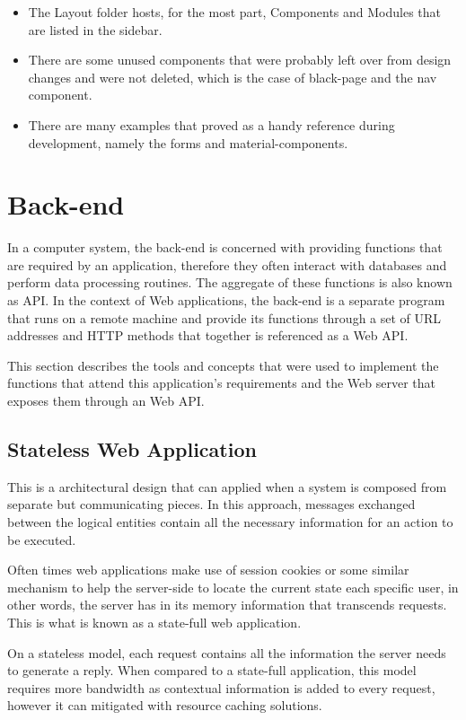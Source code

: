 \begin{itemize}
\item The Layout folder hosts, for the most part, Components and Modules that are listed in the sidebar.\item There are some unused components that were probably left over from design changes and were not deleted, which is the case of black-page and the nav component.
\item There are many examples that proved as a handy reference during development, namely the forms and material-components.
\end{itemize}

\section{Back-end}\label{cha:concepts:sec:backend}
In a computer system, the back-end is concerned with providing functions that are required by an application, therefore they often interact with databases and perform data processing routines. The aggregate of these functions is also known as \gls{API}. In the context of Web applications, the back-end is a separate program that runs on a remote machine and provide its functions through a set of \gls{URL} addresses and \gls{HTTP} methods that together is referenced as a Web \gls{API}.

This section describes the tools and concepts that were used to implement the functions that attend this application's requirements and the Web server that exposes them through an Web \gls{API}.

\subsection{Stateless Web Application}
This is a architectural design that can applied when a system is composed from separate but communicating pieces. In this approach, messages exchanged between the logical entities contain all the necessary information for an action to be executed.

Often times web applications make use of session cookies or some similar mechanism to help the server-side to locate the current state each specific user, in other words, the server has in its memory information that transcends requests. This is what is known as a state-full web application.

On a stateless model, each request contains all the information the server needs to generate a reply. When compared to a state-full application, this model requires more bandwidth as contextual information is added to every request, however it can mitigated with resource caching solutions.

